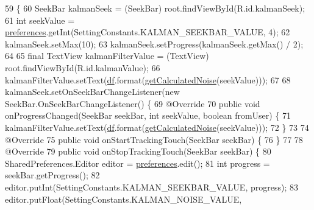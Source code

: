 \begin{DoxyCode}
59                                                    \{
60         SeekBar kalmanSeek = (SeekBar) root.findViewById(R.id.kalmanSeek);
61         \textcolor{keywordtype}{int} seekValue = \hyperlink{classit_1_1unibo_1_1torsello_1_1bluetoothpositioning_1_1fragment_1_1SettingsFragment_a52480c4d5d81ca59fe4a98ae3c623ea4_a52480c4d5d81ca59fe4a98ae3c623ea4}{preferences}.getInt(SettingConstants.KALMAN\_SEEKBAR\_VALUE, 4);
62         kalmanSeek.setMax(10);
63         kalmanSeek.setProgress(kalmanSeek.getMax() / 2);
64 
65         \textcolor{keyword}{final} TextView kalmanFilterValue = (TextView) root.findViewById(R.id.kalmanValue);
66         kalmanFilterValue.setText(\hyperlink{classit_1_1unibo_1_1torsello_1_1bluetoothpositioning_1_1fragment_1_1SettingsFragment_af6b80a700dc80c39a56d001b68a47694_af6b80a700dc80c39a56d001b68a47694}{df}.format(\hyperlink{classit_1_1unibo_1_1torsello_1_1bluetoothpositioning_1_1fragment_1_1SettingsFragment_a595d859602f34ca81957a0578c1602a6_a595d859602f34ca81957a0578c1602a6}{getCalculatedNoise}(seekValue)));
67 
68         kalmanSeek.setOnSeekBarChangeListener(\textcolor{keyword}{new} SeekBar.OnSeekBarChangeListener() \{
69             @Override
70             \textcolor{keyword}{public} \textcolor{keywordtype}{void} onProgressChanged(SeekBar seekBar, \textcolor{keywordtype}{int} seekValue, \textcolor{keywordtype}{boolean} fromUser) \{
71                 kalmanFilterValue.setText(\hyperlink{classit_1_1unibo_1_1torsello_1_1bluetoothpositioning_1_1fragment_1_1SettingsFragment_af6b80a700dc80c39a56d001b68a47694_af6b80a700dc80c39a56d001b68a47694}{df}.format(\hyperlink{classit_1_1unibo_1_1torsello_1_1bluetoothpositioning_1_1fragment_1_1SettingsFragment_a595d859602f34ca81957a0578c1602a6_a595d859602f34ca81957a0578c1602a6}{getCalculatedNoise}(seekValue)));
72             \}
73 
74             @Override
75             \textcolor{keyword}{public} \textcolor{keywordtype}{void} onStartTrackingTouch(SeekBar seekBar) \{
76             \}
77 
78             @Override
79             \textcolor{keyword}{public} \textcolor{keywordtype}{void} onStopTrackingTouch(SeekBar seekBar) \{
80                 SharedPreferences.Editor editor = \hyperlink{classit_1_1unibo_1_1torsello_1_1bluetoothpositioning_1_1fragment_1_1SettingsFragment_a52480c4d5d81ca59fe4a98ae3c623ea4_a52480c4d5d81ca59fe4a98ae3c623ea4}{preferences}.edit();
81                 \textcolor{keywordtype}{int} progress = seekBar.getProgress();
82                 editor.putInt(SettingConstants.KALMAN\_SEEKBAR\_VALUE, progress);
83                 editor.putFloat(SettingConstants.KALMAN\_NOISE\_VALUE, 

\end{DoxyCode}

